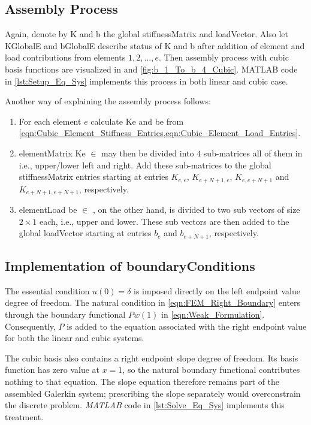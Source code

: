 \subsection{Assembly Process} \label{cha:Assembly_Process_Cubic}
Again, denote by \gls{K} and \gls{b} the global \gls{stiffnessMatrix} and \gls{loadVector}. Also let \gls{KGlobalE} and
\gls{bGlobalE} describe status of \gls{K} and \gls{b} after addition of element and load contributions from elements
$1,2, \ldots, e$. Then assembly process with cubic basis functions are visualized in  and \cref{fig:b_1_To_b_4_Cubic}. MATLAB code in \cref{lst:Setup_Eq_Sys} implements this process in both linear and cubic case.


%
Another way of explaining the assembly process follows:
\begin{enumerate}
	\item For each element $e$ calculate \gls{Ke} and \gls{be} from
	\cref{eqn:Cubic_Element_Stiffness_Entries,eqn:Cubic_Element_Load_Entries}.

	\item \Gls{elementMatrix} \gls{Ke} $\in$  may then be divided into $4$ sub-matrices all of them in  i.e., upper/lower left and right. Add these sub-matrices to the global \gls{stiffnessMatrix} entries
	starting at entries $K_{e, e}$, $K_{e + N + 1, e}$, $K_{e, e + N + 1}$ and $K_{e + N + 1,e + N + 1}$, respectively.

	\item \Gls{elementLoad} \gls{be} $\in$ , on the other hand, is divided to two sub vectors of size
	$2\times 1$ each, i.e., upper and lower. These sub vectors are then added to the global \gls{loadVector} starting at entries
	$b_{e}$ and $b_{e + N + 1}$, respectively.
\end{enumerate}
%
\subsection[Implementation of Boundary Conditions]{Implementation of \glspl{boundaryCondition}}
The essential condition $u(0)=\delta$ is imposed directly on the left endpoint value degree of freedom. The natural condition in \cref{eqn:FEM_Right_Boundary} enters through the boundary functional $P w(1)$ in \cref{eqn:Weak_Formulation}. Consequently, $P$ is added to the equation associated with the right endpoint value for both the linear and cubic systems.

The cubic basis also contains a right endpoint slope degree of freedom. Its basis function has zero value at $x=1$, so the natural boundary functional contributes nothing to that equation. The slope equation therefore remains part of the assembled Galerkin system; prescribing the slope separately would overconstrain the discrete problem. \emph{MATLAB} code in \cref{lst:Solve_Eq_Sys} implements this treatment.
%
